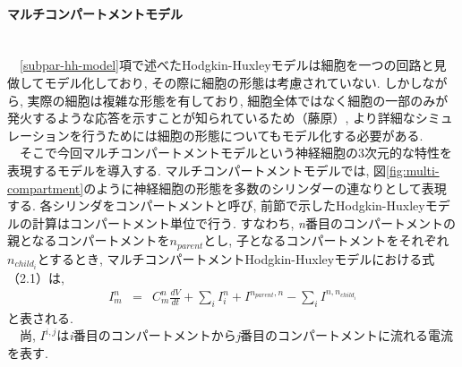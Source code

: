 \paragraph{マルチコンパートメントモデル}~\\
　\ref{subpar-hh-model}項で述べたHodgkin-Huxleyモデルは細胞を一つの回路と見做してモデル化しており,
その際に細胞の形態は考慮されていない. しかしながら, 実際の細胞は複雑な形態を有しており,
細胞全体ではなく細胞の一部のみが発火するような応答を示すことが知られているため（藤原\cite{fujiwara-master}）,
より詳細なシミュレーションを行うためには細胞の形態についてもモデル化する必要がある.\\
　そこで今回マルチコンパートメントモデルという神経細胞の3次元的な特性を表現するモデルを導入する.
マルチコンパートメントモデルでは, 図\ref{fig:multi-compartment}のように神経細胞の形態を多数のシリンダーの連なりとして表現する.
各シリンダをコンパートメントと呼び, 前節で示したHodgkin-Huxleyモデルの計算はコンパートメント単位で行う. すなわち,
{\it n}番目のコンパートメントの親となるコンパートメントを$n_{parent}$とし, 子となるコンパートメントをそれぞれ$n_{child_{i}}$とするとき,
マルチコンパートメントHodgkin-Huxleyモデルにおける式（2.1）は,
\begin{eqnarray}
  I_{m}^{n} & = & C_{m}^{n}\frac{dV}{dt} + \sum_{i} I_{i}^{n} + I^{n_{parent}, n} - \sum_{i} I^{n, n_{child_{i}}}
\end{eqnarray}
と表される.\\
　尚, $I^{i, j}$は{\it i}番目のコンパートメントから{\it j}番目のコンパートメントに流れる電流を表す.

